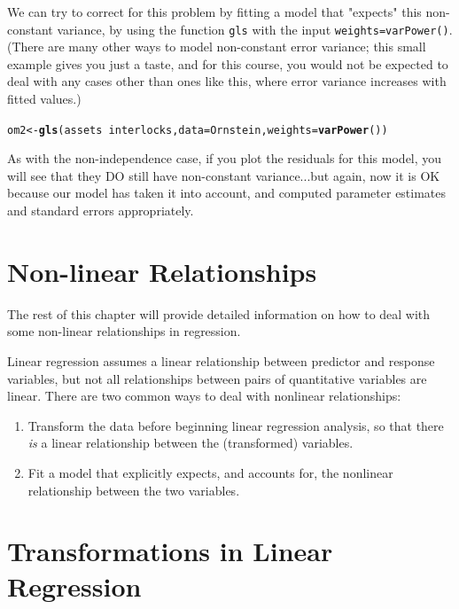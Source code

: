 \documentclass[twoside]{book}\usepackage[]{graphicx}\usepackage[]{xcolor}
\makeatletter
\newcommand{\hlopt}[1]{\textcolor[rgb]{0,0,0}{#1}}%
\newcommand{\hlstd}[1]{\textcolor[rgb]{0.345,0.345,0.345}{#1}}%
\newcommand{\hlkwb}[1]{\textcolor[rgb]{0.69,0.353,0.396}{#1}}%
\newcommand{\hlkwc}[1]{\textcolor[rgb]{0.333,0.667,0.333}{#1}}%
\newcommand{\hlkwd}[1]{\textcolor[rgb]{0.737,0.353,0.396}{\textbf{#1}}}%
\newenvironment{kframe}{%
 \def\at@end@of@kframe{}%
 \ifinner\ifhmode%
  \def\at@end@of@kframe{\end{minipage}}%
  \begin{minipage}{\columnwidth}%
 \fi\fi%
 \def\FrameCommand##1{\hskip\@totalleftmargin \hskip-\fboxsep
 \colorbox{shadecolor}{##1}\hskip-\fboxsep
     \hskip-\linewidth \hskip-\@totalleftmargin \hskip\columnwidth}%
 \MakeFramed {\advance\hsize-\width
   \@totalleftmargin\z@ \linewidth\hsize
   \@setminipage}}%
 {\par\unskip\endMakeFramed%
 \at@end@of@kframe}
\newenvironment{knitrout}{}{} %
\def\myindex#1{\index{#1}}
\newcounter{example}[section]
\makeatother
\begin{document}
We can try to correct for this problem by fitting a model that "expects" this non-constant variance, by using the function \texttt{gls} with the input \texttt{weights=varPower()}.  (There are many other ways to model non-constant error variance; this small example gives you just a taste, and for this course, you would not be expected to deal with any cases other than ones like this, where error variance increases with fitted values.)
\begin{knitrout}
\color{fgcolor}\begin{kframe}
\begin{alltt}
\hlstd{om2} \hlkwb{<-} \hlkwd{gls}\hlstd{(assets} \hlopt{~} \hlstd{interlocks,} \hlkwc{data} \hlstd{= Ornstein,} \hlkwc{weights} \hlstd{=} \hlkwd{varPower}\hlstd{())}
\end{alltt}
\end{kframe}
\end{knitrout}

As with the non-independence case, if you plot the residuals for this model, you will see that they DO still have non-constant variance...but again, now it is OK because our model has taken it into account, and computed parameter estimates and standard errors appropriately.

\section{Non-linear Relationships}
The rest of this chapter will provide detailed information on how to deal with some non-linear relationships in regression.

Linear regression assumes a linear relationship between predictor and response variables, but not all relationships between pairs of quantitative variables are linear.  There are two common ways to deal with
nonlinear relationships:
\begin{enumerate}
	\item
		Transform the data before beginning linear regression analysis, so that there \emph{is} a linear relationship between the (transformed) variables.
	\item
		Fit a model that explicitly expects, and accounts for, the nonlinear relationship between the two variables. 
\end{enumerate}


\section{Transformations in Linear Regression}
\myindex{transformation!of data}%
\end{document}
